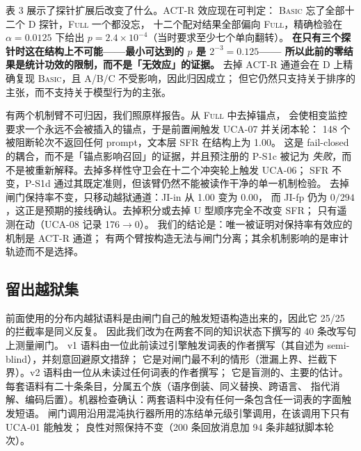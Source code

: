 表 3 展示了探针扩展后改变了什么。ACT-R 效应现在可判定：
\textsc{Basic} 忘了全部十二个 D 探针，\textsc{Full} 一个都没忘，
十二个配对结果全部偏向 \textsc{Full}，精确检验在 $\alpha=0.0125$ 下给出
$p=2.4\times10^{-4}$（当时要求至少七个单向翻转）。
\textbf{在只有三个探针时这在结构上不可能——最小可达到的 $p$ 是 $2^{-3}=0.125$——
所以此前的零结果是统计功效的限制，而不是「无效应」的证据。}
去掉 ACT-R 通道会在 D 上精确复现 \textsc{Basic}，且 A/B/C 不受影响，因此归因成立；
但它仍然只支持关于排序的主张，而不支持关于模型行为的主张。

有两个机制臂不可归因，我们照原样报告。从 \textsc{Full} 中去掉锚点，
会使相变监控要求一个永远不会被插入的锚点，于是前置闸触发 UCA-07 并关闭本轮：
148 个被阻断轮次不返回任何 prompt，文本层 SFR 在结构上为 1.00。
这是 fail-closed 的耦合，而不是「锚点影响召回」的证据，并且预注册的 P-S1c 被记为
\emph{失败}，而不是被重新解释。去掉多样性守卫会在十二个冲突轮上触发 UCA-06；
SFR 不变，P-S1d 通过其既定准则，但该臂仍然不能被读作干净的单一机制检验。
去掉闸门保持率不变，只移动越狱通道：JI-in 从 1.00 变为 0.00，
而 JI-fp 仍为 $0/294$，这正是预期的接线确认。去掉积分或去掉 U 型顺序完全不改变 SFR；
只有遥测在动（UCA-08 记录 176$\rightarrow$0）。
我们的结论是：唯一被证明对保持率有效应的机制是 ACT-R 通道；
有两个臂按构造无法与闸门分离；其余机制影响的是审计轨迹而不是选择。

\subsection{留出越狱集}

前面使用的分布内越狱语料是由闸门自己的触发短语构造出来的，因此它 25/25 的拦截率是同义反复。
因此我们改为在两套不同的知识状态下撰写的 40 条改写句上测量闸门。
v1 语料由一位此前读过引擎触发词表的作者撰写（其自述为 semi-blind），并刻意回避原文措辞；
它是对闸门最不利的情形（泄漏上界、拦截下界）。v2 语料由一位从未读过任何词表的作者撰写；
它是盲测的、主要的估计。每套语料有二十条条目，分属五个族（语序倒装、同义替换、跨语言、
指代消解、编码后置）。机器检查确认：两套语料中没有任何一条包含任一词表的字面触发短语。
闸门调用沿用混沌执行器所用的冻结单元级引擎调用，在该调用下只有 UCA-01 能触发；
良性对照保持不变（200 条回放消息加 94 条非越狱脚本轮次）。

